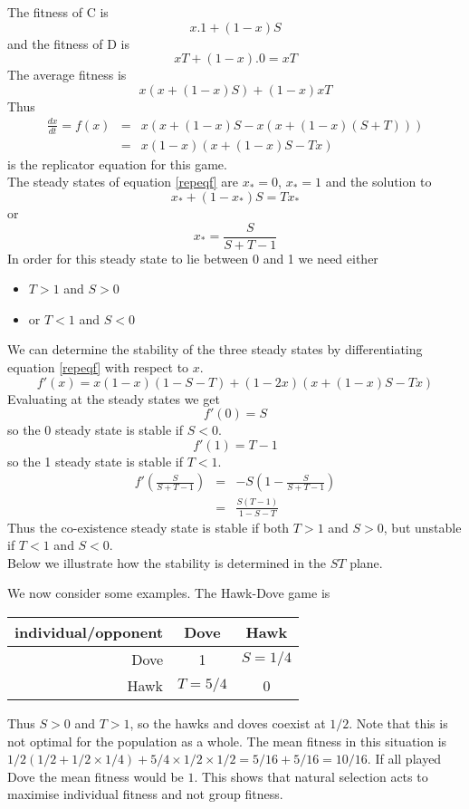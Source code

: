 The fitness of C is
\[
x.1+(1-x)S
\]
and the fitness of D is
\[
xT+(1-x).0 = xT
\]
The average fitness is
\[
x(x+(1-x)S) + (1-x)xT
\]
Thus 
\begin{eqnarray}
\frac{dx}{dt} = f(x) & = & x (x+(1-x)S - x(x+(1-x)(S+T))) \nonumber \\
& = & x (1-x) (x+(1-x)S - Tx)
\label{repeqf}
\end{eqnarray}
is the replicator equation for this game.\\

The steady states of equation \ref{repeqf} are $x_*=0$, $x_*=1$ and the
solution to
\[
x_*+(1-x_*)S = Tx_*
\]
or 
\[
x_* = \frac{S}{S+T-1}
\]
In order for this steady state to lie between 0 and 1 we need either
\begin{itemize}
\item $T>1$ and $S>0$\\
\item or $T<1$ and $S<0$\\
\end{itemize}

We can determine the stability of the three steady states by
differentiating equation \ref{repeqf} with respect to $x$.
\[
f'(x) = x(1-x)(1-S-T) + (1-2x)(x+(1-x)S-Tx)
\]
Evaluating at the steady states we get
\[
f'(0) = S
\]
so the 0 steady state is stable if $S<0$. 
\[
f'(1) = T - 1 
\]
so the 1 steady state is stable if $T<1$. 
\begin{eqnarray*}
f'\left(\frac{S}{S+T-1}\right) & = & -S (1 - \frac{S}{S+T-1}) \\ 
& = & \frac{S(T-1)}{1-S-T} 
\end{eqnarray*}
Thus the co-existence steady state is stable if both $T>1$ and
$S>0$, but unstable if $T<1$ and $S<0$.\\

Below we illustrate how the stability is determined in
the $ST$ plane.\\

\vspace{5cm}

\newpage

We now consider some examples. The Hawk-Dove game is

\begin{tabular}{r|cc}
individual/opponent & Dove & Hawk \\
\hline
Dove & 1 & $S=1/4$ \\
Hawk & $T=5/4$ & 0 
\end{tabular}

Thus $S>0$ and $T>1$, so the hawks and doves coexist at $1/2$. Note
that this is not optimal for the population as a whole. The mean
fitness in this situation is $1/2(1/2+1/2 \times 1/4)+5/4 \times
1/2\times1/2=5/16+5/16=10/16$. If all played Dove the mean fitness would be
$1$. This shows that natural selection acts to maximise individual
fitness and not group fitness.\\


